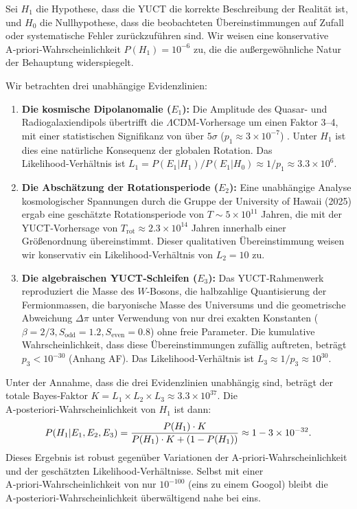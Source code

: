 \documentclass[11pt,a4paper]{article}
\begin{document}
	Sei \(H_1\) die Hypothese, dass die YUCT die korrekte Beschreibung der Realität ist, und \(H_0\) die Nullhypothese, dass die beobachteten Übereinstimmungen auf Zufall oder systematische Fehler zurückzuführen sind. Wir weisen eine konservative A‑priori‑Wahrscheinlichkeit \(P(H_1) = 10^{-6}\) zu, die die außergewöhnliche Natur der Behauptung widerspiegelt.
	
	Wir betrachten drei unabhängige Evidenzlinien:
	\begin{enumerate}
		\item \textbf{Die kosmische Dipolanomalie (\(E_1\)):} Die Amplitude des Quasar- und Radiogalaxiendipols übertrifft die \(\Lambda\)CDM‑Vorhersage um einen Faktor 3–4, mit einer statistischen Signifikanz von über \(5\sigma\) (\(p_1 \approx 3 \times 10^{-7}\)) \cite{Secrest2025, Singal2024}. Unter \(H_1\) ist dies eine natürliche Konsequenz der globalen Rotation. Das Likelihood‑Verhältnis ist \(L_1 = P(E_1|H_1)/P(E_1|H_0) \approx 1/p_1 \approx 3.3 \times 10^6\).
		
		\item \textbf{Die Abschätzung der Rotationsperiode (\(E_2\)):} Eine unabhängige Analyse kosmologischer Spannungen durch die Gruppe der University of Hawaii (2025) ergab eine geschätzte Rotationsperiode von \(T \sim 5 \times 10^{11}\) Jahren, die mit der YUCT‑Vorhersage von \(T_{\mathrm{rot}} \approx 2.3 \times 10^{14}\) Jahren innerhalb einer Größenordnung übereinstimmt. Dieser qualitativen Übereinstimmung weisen wir konservativ ein Likelihood‑Verhältnis von \(L_2 = 10\) zu.
		
		\item \textbf{Die algebraischen YUCT‑Schleifen (\(E_3\)):} Das YUCT‑Rahmenwerk reproduziert die Masse des \(W\)‑Bosons, die halbzahlige Quantisierung der Fermionmassen, die baryonische Masse des Universums und die geometrische Abweichung \(\Delta\pi\) unter Verwendung von nur drei exakten Konstanten (\(\beta=2/3, S_{\mathrm{odd}}=1.2, S_{\mathrm{even}}=0.8\)) ohne freie Parameter. Die kumulative Wahrscheinlichkeit, dass diese Übereinstimmungen zufällig auftreten, beträgt \(p_3 < 10^{-30}\) (Anhang AF). Das Likelihood‑Verhältnis ist \(L_3 \approx 1/p_3 \approx 10^{30}\).
	\end{enumerate}
	
	Unter der Annahme, dass die drei Evidenzlinien unabhängig sind, beträgt der totale Bayes‑Faktor \(K = L_1 \times L_2 \times L_3 \approx 3.3 \times 10^{37}\). Die A‑posteriori‑Wahrscheinlichkeit von \(H_1\) ist dann:
	\begin{equation}
		\scriptsize
		P(H_1 | E_1, E_2, E_3) = \frac{P(H_1) \cdot K}{P(H_1) \cdot K + (1 - P(H_1))} \approx 1 - 3 \times 10^{-32}.
	\end{equation}
	Dieses Ergebnis ist robust gegenüber Variationen der A‑priori‑Wahrscheinlichkeit und der geschätzten Likelihood‑Verhältnisse. Selbst mit einer A‑priori‑Wahrscheinlichkeit von nur \(10^{-100}\) (eins zu einem Googol) bleibt die A‑posteriori‑Wahrscheinlichkeit überwältigend nahe bei eins.
	
\end{document}
